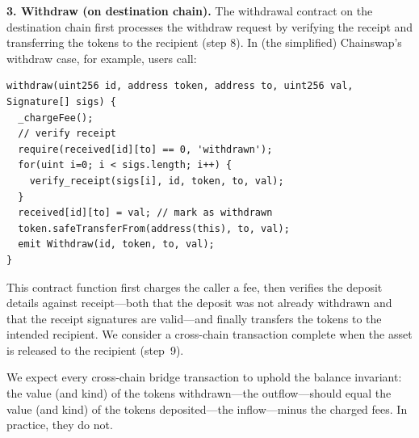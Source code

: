 \textbf{3. Withdraw (on destination chain).}
The withdrawal contract on the destination chain first processes the withdraw
request by verifying the receipt and transferring the tokens to the recipient
(step 8). In (the simplified) Chainswap's withdraw case, for example, users call:
\begin{lstlisting}
withdraw(uint256 id, address token, address to, uint256 val, Signature[] sigs) {
  _chargeFee();
  // verify receipt
  require(received[id][to] == 0, 'withdrawn');
  for(uint i=0; i < sigs.length; i++) {
    verify_receipt(sigs[i], id, token, to, val);
  }
  received[id][to] = val; // mark as withdrawn
  token.safeTransferFrom(address(this), to, val);
  emit Withdraw(id, token, to, val);
}
\end{lstlisting}
This contract function first charges the caller a fee, then verifies the
deposit details against receipt---both that the deposit was not already
withdrawn and that the receipt signatures are valid---and finally transfers the
tokens to the intended recipient.  We consider a cross-chain transaction
complete when the asset is released to the recipient (step~9).

We expect every cross-chain bridge transaction to uphold the balance invariant:
the value (and kind) of the tokens withdrawn---the outflow---should equal the
value (and kind) of the tokens deposited---the inflow---minus the charged fees.
In practice, they do not.




